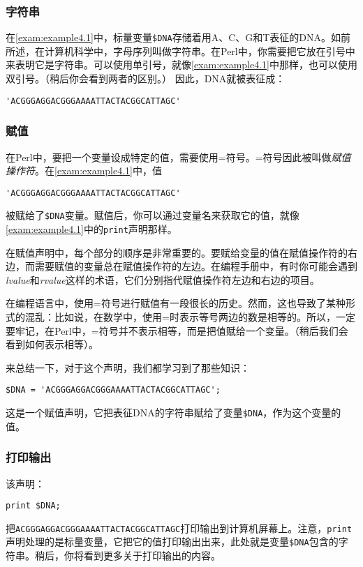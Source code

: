 \subsubsection{字符串}
在\autoref{exam:example4.1}中，标量变量\verb|$DNA|存储着用A、C、G和T表征的DNA。如前所述，在计算机科学中，字母序列叫做字符串。在Perl中，你需要把它放在引号中来表明它是字符串。可以使用单引号，就像\autoref{exam:example4.1}中那样，也可以使用双引号。（稍后你会看到两者的区别。）
因此，DNA就被表征成：

\begin{lstlisting}
'ACGGGAGGACGGGAAAATTACTACGGCATTAGC'
\end{lstlisting}

\subsubsection{赋值}
\label{sect:sect4.2.4.3}
在Perl中，要把一个变量设成特定的值，需要使用=符号。=符号因此被叫做\textit{赋值操作符}。在\autoref{exam:example4.1}中，值

\begin{lstlisting}
'ACGGGAGGACGGGAAAATTACTACGGCATTAGC' 
\end{lstlisting}
被赋给了\verb|$DNA|变量。赋值后，你可以通过变量名来获取它的值，就像\autoref{exam:example4.1}中的\verb|print|声明那样。

在赋值声明中，每个部分的顺序是非常重要的。要赋给变量的值在赋值操作符的右边，而需要赋值的变量总在赋值操作符的左边。在编程手册中，有时你可能会遇到\textit{lvalue}和\textit{rvalue}这样的术语，它们分别指代赋值操作符左边和右边的项目。

在编程语言中，使用=符号进行赋值有一段很长的历史。然而，这也导致了某种形式的混乱：比如说，在数学中，使用=时表示等号两边的数是相等的。所以，一定要牢记，在Perl中，=符号并不表示相等，而是把值赋给一个变量。（稍后我们会看到如何表示相等）。

来总结一下，对于这个声明，我们都学习到了那些知识：

\begin{lstlisting}
$DNA = 'ACGGGAGGACGGGAAAATTACTACGGCATTAGC';
\end{lstlisting}

这是一个赋值声明，它把表征DNA的字符串赋给了变量\verb|$DNA|，作为这个变量的值。

\subsubsection{打印输出}
该声明：

\begin{lstlisting}
print $DNA;
\end{lstlisting}
把\verb|ACGGGAGGACGGGAAAATTACTACGGCATTAGC|打印输出到计算机屏幕上。注意，\verb|print|声明处理的是标量变量，它把它的值打印输出出来，此处就是变量\verb|$DNA|包含的字符串。稍后，你将看到更多关于打印输出的内容。

